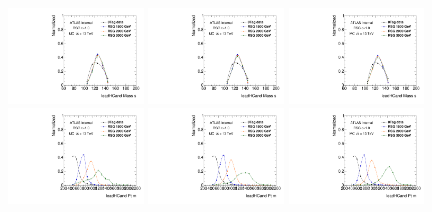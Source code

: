 \begin{figure}[htbp!]
\begin{center}
\includegraphics[angle=270, width=0.32\textwidth]{./figures/boosted/Truth/Moriond_comp_0_FourTag_Signal_leadHCand_Mass_s.pdf}
\includegraphics[angle=270, width=0.32\textwidth]{./figures/boosted/Truth/Moriond_comp_0_ThreeTag_Signal_leadHCand_Mass_s.pdf}
\includegraphics[angle=270, width=0.32\textwidth]{./figures/boosted/Truth/Moriond_comp_0_TwoTag_split_Signal_leadHCand_Mass_s.pdf}\\
\includegraphics[angle=270, width=0.32\textwidth]{./figures/boosted/Truth/Moriond_comp_0_FourTag_Signal_leadHCand_Pt_m.pdf}
\includegraphics[angle=270, width=0.32\textwidth]{./figures/boosted/Truth/Moriond_comp_0_ThreeTag_Signal_leadHCand_Pt_m.pdf}
\includegraphics[angle=270, width=0.32\textwidth]{./figures/boosted/Truth/Moriond_comp_0_TwoTag_split_Signal_leadHCand_Pt_m.pdf}\\

\end{center}
\end{figure}
